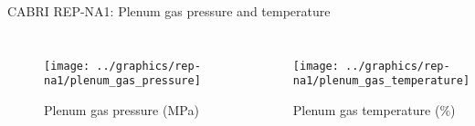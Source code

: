 \begin{frame}{CABRI REP-NA1: Plenum gas pressure and temperature}
  \footnotesize 

  \begin{columns}[t]


  \begin{figure}[h]
    \texttt{[image: ../graphics/rep-na1/plenum\_gas\_pressure]}
    \caption{Plenum gas pressure (MPa)}
  \end{figure}


  \begin{figure}[h]
    \texttt{[image: ../graphics/rep-na1/plenum\_gas\_temperature]}
    \caption{Plenum gas temperature ($\%$)}
  \end{figure}

  \end{columns}

\end{frame}
